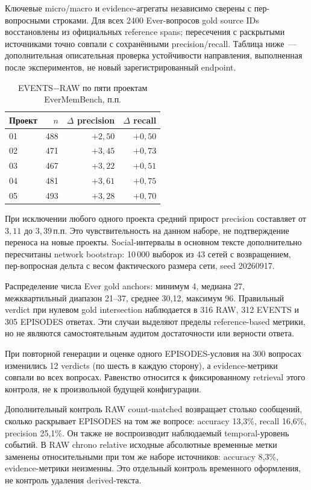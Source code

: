 \documentclass[11pt,a4paper]{article}
\newcommand{\pp}{\,\text{п.п.}}
\begin{document}
Ключевые micro/macro и evidence-агрегаты независимо сверены с пер-вопросными
строками. Для всех 2400 Ever-вопросов gold source IDs восстановлены из
официальных reference spans; пересечения с раскрытыми источниками точно
совпали с сохранёнными precision/recall. Таблица ниже~--- дополнительная
описательная проверка устойчивости направления, выполненная после экспериментов,
не новый зарегистрированный endpoint.

\begin{table}[ht]
\centering\small
\begin{tabular}{lrrr}
\toprule
Проект & $n$ & $\Delta$ precision & $\Delta$ recall\\
\midrule
01 & 488 & $+2{,}50$ & $+0{,}50$\\
02 & 471 & $+3{,}45$ & $+0{,}73$\\
03 & 467 & $+3{,}22$ & $+0{,}51$\\
04 & 481 & $+3{,}61$ & $+0{,}75$\\
05 & 493 & $+3{,}28$ & $+0{,}70$\\
\bottomrule
\end{tabular}
\caption{EVENTS$-$RAW по пяти проектам EverMemBench, п.п.}
\end{table}

При исключении любого одного проекта средний прирост precision составляет
от $3{,}11$ до $3{,}39\pp$ Это чувствительность на данном наборе, не подтверждение
переноса на новые проекты. Social-интервалы в основном тексте дополнительно
пересчитаны network bootstrap: 10\,000 выборок из 43 сетей с возвращением,
пер-вопросная дельта с весом фактического размера сети, seed 20260917.

Распределение числа Ever gold anchors: минимум 4, медиана 27,
межквартильный диапазон 21--37, среднее 30{,}12, максимум 96. Правильный verdict
при нулевом gold intersection наблюдается в 316 RAW, 312 EVENTS и
305 EPISODES ответах. Эти случаи выделяют пределы reference-based метрики,
но не являются самостоятельным аудитом достаточности или верности ответа.

При повторной генерации и оценке одного EPISODES-условия на 300 вопросах
изменились 12 verdicts (по шесть в каждую сторону), а evidence-метрики
совпали во всех вопросах. Равенство относится к фиксированному retrieval
этого контроля, не к произвольной будущей конфигурации.

Дополнительный контроль RAW count-matched возвращает столько сообщений,
сколько раскрывает EPISODES на том же вопросе: accuracy 13{,}3\%, recall 16{,}6\%,
precision 25{,}1\%. Он также не воспроизводит наблюдаемый temporal-уровень
событий. В RAW chrono relative исходные абсолютные временные метки
заменены относительными при том же наборе источников: accuracy 8{,}3\%,
evidence-метрики неизменны. Это отдельный контроль временного оформления,
не контроль удаления derived-текста.
\end{document}
